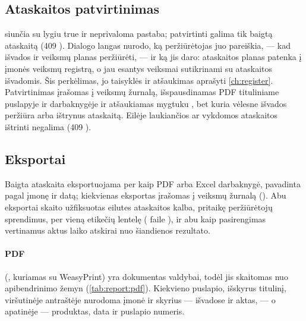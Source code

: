 \subsection{Ataskaitos patvirtinimas}

 siunčia  su  lygiu
true ir neprivaloma pastaba; patvirtinti galima tik baigtą ataskaitą (409 ).
Dialogo langas nurodo, ką peržiūrėtojas juo pareiškia, --- kad išvados ir veiksmų planas
peržiūrėti, --- ir ką jis daro: ataskaitos planas patenka į įmonės veiksmų registrą, o jau
esantys veiksmai sutikrinami su ataskaitos išvadomis. Šis perkėlimas, jo taisyklės ir atšaukimas
aprašyti \cref{ch:register}. Patvirtinimas įrašomas į veiksmų žurnalą, išspausdinamas PDF
tituliniame puslapyje ir darbaknygėje ir atšaukiamas mygtuku , bet
kuria vėlesne išvados peržiūra arba ištrynus ataskaitą. Eilėje laukiančios ar vykdomos
ataskaitos ištrinti negalima (409 ).

\subsection{Eksportai}

Baigta ataskaita eksportuojama per  kaip PDF arba Excel
darbaknygė, pavadinta pagal įmonę ir datą; kiekvienas eksportas įrašomas į veiksmų žurnalą
(). Abu eksportai skaito užfiksuotas eilutes ataskaitos kalba, pritaikę
peržiūrėtojų sprendimus, per vieną etikečių lentelę ( faile
), ir abu kaip pasirengimas vertinamus aktus laiko atskirai nuo
šiandienos rezultato.

\paragraph{PDF} (, kuriamas su WeasyPrint) yra dokumentas valdybai,
todėl jis skaitomas nuo apibendrinimo žemyn (\cref{tab:report:pdf}). Kiekvieno puslapio,
išskyrus titulinį, viršutinėje antraštėje nurodoma įmonė ir skyrius --- išvadose ir aktas, --- o
apatinėje --- produktas, data ir puslapio numeris.

